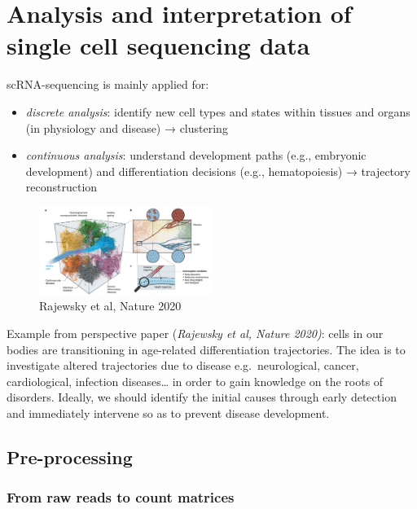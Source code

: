 \graphicspath{{chapters/03/}}
\chapter{Analysis and interpretation of single cell sequencing data}

scRNA-sequencing is mainly applied for:

\begin{itemize}
\tightlist
\item
  \emph{discrete analysis}: identify new cell types and states within
  tissues and organs (in physiology and disease) → clustering
\item
  \emph{continuous analysis}: understand development paths (e.g.,
  embryonic development) and differentiation decisions (e.g.,
  hematopoiesis) → trajectory reconstruction
\end{itemize}

\begin{figure}
\centering
\includegraphics[width=0.5\textwidth]{images/Screenshot.png}
\caption{Rajewsky et al, Nature 2020}
\end{figure}

Example from perspective paper (\emph{Rajewsky et al, Nature 2020)}:
cells in our bodies are transitioning in age-related differentiation
trajectories. The idea is to investigate altered trajectories due to
disease e.g.~neurological, cancer, cardiological, infection
diseases\ldots{} in order to gain knowledge on the roots of disorders.
Ideally, we should identify the initial causes through early detection
and immediately intervene so as to prevent disease development.

\hypertarget{pre-processing}{%
\section{Pre-processing}\label{pre-processing}}

\hypertarget{from-raw-reads-to-count-matrices}{%
\subsection{From raw reads to count
matrices}\label{from-raw-reads-to-count-matrices}}

